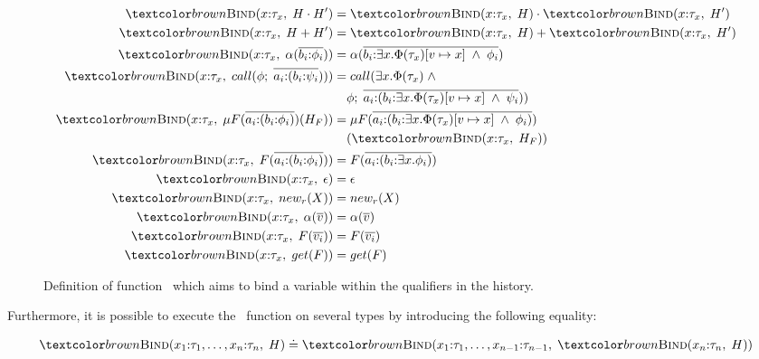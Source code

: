 \begin{figure}[H]
    \begin{equation*}
        \begin{split}
            \bind(x{:}\tau_x, \;H \cdot H') =& \; \bind(x{:}\tau_x, \;H) \cdot \bind(x{:}\tau_x, \;H') \\
            \bind(x{:}\tau_x, \;H + H') =& \; \bind(x{:}\tau_x, \;H) + \bind(x{:}\tau_x, \;H') \\
            \bind(x{:}\tau_x, \;\alpha(\overline{b_i{:}\phi_i})) =& \; \alpha(\overline{b_i{:}\exists x. \Phi(\tau_x)[v \mapsto x] \;\land\; \phi_i}) \\
            \bind(x{:}\tau_x, \;call(\phi; \;\overline{a_i{:}(b_i{:}\psi_i}))) =& \; call(\exists x. \Phi(\tau_x) \;\land\; \\
            & \phi; \;\overline{a_i{:}(b_i{:}\exists x. \Phi(\tau_x)[v \mapsto x] \;\land\; \psi_i})) \\
            \bind(x{:}\tau_x, \;\mu F(\overline{a_i{:}({b_i{:}\phi_i})})(H_F)) =& \;\mu F(\overline{a_i{:}({b_i{:}\exists x. \Phi(\tau_x)[v \mapsto x] \;\land\; \phi_i})}) \\
            & (\bind(x{:}\tau_x, \;H_F)) \\
            \bind(x{:}\tau_x, \;F(\overline{a_i{:}(b_i{:}\phi_i)})) =& \;F(\overline{a_i{:}(b_i{:}\exists x.\phi_i)}) \\
            \bind(x{:}\tau_x, \;\epsilon) =& \;\epsilon \\
            \bind(x{:}\tau_x, \;new_r(X)) =& \; new_r(X) \\
            \bind(x{:}\tau_x, \;\alpha(\overline{v})) =& \;\alpha(\overline{v}) \\
            \bind(x{:}\tau_x, \;F(\overline{v_i})) =& \;F(\overline{v_i}) \\
            \bind(x{:}\tau_x, \;get(F)) =& \;get(F)
        \end{split}
        \end{equation*}
    \caption{Definition of function \bind\ which aims to bind a variable within the qualifiers in the history.}
    \label{eq:bind}
\end{figure}

Furthermore, it is possible to execute the \bind\ function on several types by introducing the following equality:

\begin{equation}
    \bind(x_1{:}\tau_1, \dots, x_n{:}\tau_n, \;H) \doteq \bind(x_1{:}\tau_1, \dots, x_{n-1}{:}\tau_{n-1}, \;\bind(x_n{:}\tau_n, \;H))
\end{equation}

